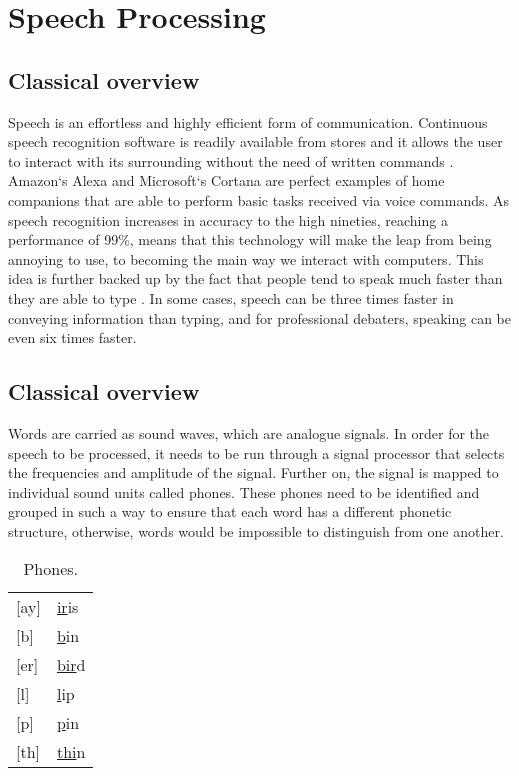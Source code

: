 \chapter{Speech Processing}\label{ch:speech_processing}

\section{Classical overview}
Speech is an effortless and highly efficient form of communication.
Continuous speech recognition software is readily available from stores and it allows the user to interact with its surrounding without the need of written commands
\cite[p.~396]{callan2003artificial}. Amazon`s Alexa 
\cite{Alexa} and Microsoft`s Cortana 
\cite{Cortana} are perfect examples of home companions that are able to perform basic tasks received via voice commands.
As speech recognition increases in accuracy to the high nineties, reaching a performance of 99\%,  means that this technology will make the leap from being annoying to use, to becoming the main way we interact with computers. 
This idea is further backed up by the fact that people tend to speak much faster than they are able to type \cite{Speed}.
In some cases, speech can be three times faster in conveying information than typing, and for professional debaters,
speaking can be even six times faster. \\

\section{Classical overview}
Words are carried as sound waves, which are analogue signals.
In order for the speech to be processed,
it needs to be run through a signal processor that selects the frequencies and amplitude of the signal.
Further on, the signal is mapped to individual sound units called phones.
These phones need to be identified and grouped in such a way to ensure that each word has a different phonetic structure,
otherwise, words would be impossible to distinguish from one another. \\

\begin{table}[H]
\centering
	\caption{Phones.}
	\label{my-label}
	\begin{tabular}{l l}
		{[}ay{]} & \underline{ir}is \\
		{[}b{]}  & \underline{b}in  \\
		{[}er{]} & \underline{bir}d \\
		{[}l{]}  & \underline{l}ip  \\
		{[}p{]}  & \underline{p}in  \\
		{[}th{]} & \underline{thi}n
	\end{tabular}
\end{table}

